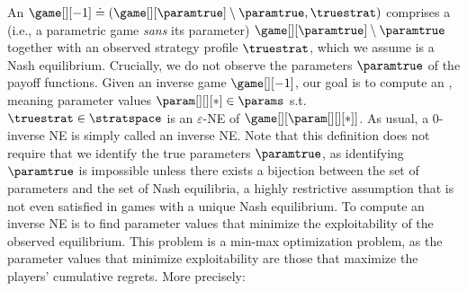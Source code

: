 An  $\game[][-1] \doteq 
(\game[][\paramtrue] \setminus \paramtrue, \truestrat)$ comprises a  (i.e., a parametric game \emph{sans\/} its parameter) $\game[][\paramtrue] \setminus \paramtrue$ together with an observed strategy profile $\truestrat$, which we assume is a Nash equilibrium.
Crucially, we do not observe the parameters $\paramtrue$ of the payoff functions.
% 
% 
Given an inverse game $\game[][-1]$, our goal is to compute an , meaning parameter values $\param[][][*] \in \params$ s.t.\@ $\truestrat \in \stratspace$ is an $\varepsilon$-NE of $\game[][{\param[][][*]}]$.
As usual, a 0-inverse NE is simply called an inverse NE.
Note that this definition does not require that we identify
the true parameters $\paramtrue$, as identifying $\paramtrue$ is impossible unless there exists a bijection between the set of parameters and the set of Nash equilibria, a highly restrictive assumption that is not even satisfied in games with a unique Nash equilibrium.
To compute an inverse NE is to find parameter values that minimize the exploitability of the observed equilibrium.
This problem is a min-max optimization problem, as the parameter values that minimize exploitability are those that maximize the players' cumulative regrets.
More precisely:


